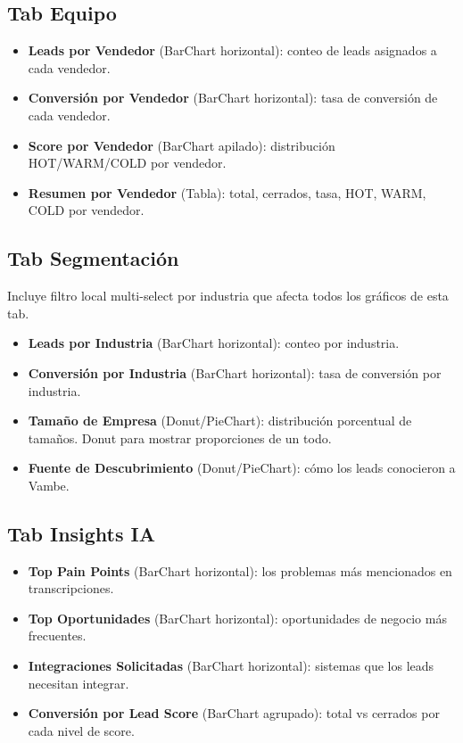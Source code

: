 \documentclass[11pt,a4paper]{article}
\begin{document}
\subsection{Tab Equipo}

\begin{itemize}[noitemsep]
  \item \textbf{Leads por Vendedor} (BarChart horizontal): conteo de leads asignados a cada vendedor.
  \item \textbf{Conversión por Vendedor} (BarChart horizontal): tasa de conversión de cada vendedor.
  \item \textbf{Score por Vendedor} (BarChart apilado): distribución HOT/WARM/COLD por vendedor.
  \item \textbf{Resumen por Vendedor} (Tabla): total, cerrados, tasa, HOT, WARM, COLD por vendedor.
\end{itemize}

\subsection{Tab Segmentación}

Incluye filtro local multi-select por industria que afecta todos los gráficos de esta tab.

\begin{itemize}[noitemsep]
  \item \textbf{Leads por Industria} (BarChart horizontal): conteo por industria.
  \item \textbf{Conversión por Industria} (BarChart horizontal): tasa de conversión por industria.
  \item \textbf{Tamaño de Empresa} (Donut/PieChart): distribución porcentual de tamaños. Donut para mostrar proporciones de un todo.
  \item \textbf{Fuente de Descubrimiento} (Donut/PieChart): cómo los leads conocieron a Vambe.
\end{itemize}

\subsection{Tab Insights IA}

\begin{itemize}[noitemsep]
  \item \textbf{Top Pain Points} (BarChart horizontal): los problemas más mencionados en transcripciones.
  \item \textbf{Top Oportunidades} (BarChart horizontal): oportunidades de negocio más frecuentes.
  \item \textbf{Integraciones Solicitadas} (BarChart horizontal): sistemas que los leads necesitan integrar.
  \item \textbf{Conversión por Lead Score} (BarChart agrupado): total vs cerrados por cada nivel de score.
\end{itemize}
\end{document}
